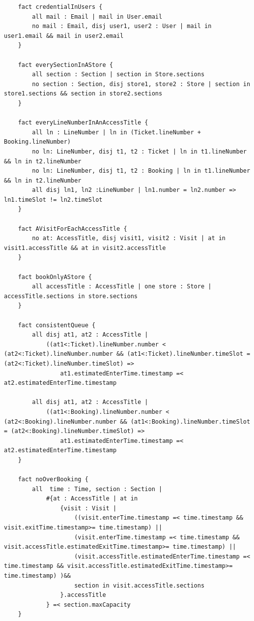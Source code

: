 \begin{lstlisting}
    fact credentialInUsers {
        all mail : Email | mail in User.email
        no mail : Email, disj user1, user2 : User | mail in user1.email && mail in user2.email
    }

    fact everySectionInAStore {
        all section : Section | section in Store.sections
        no section : Section, disj store1, store2 : Store | section in store1.sections && section in store2.sections
    }

    fact everyLineNumberInAnAccessTitle {
        all ln : LineNumber | ln in (Ticket.lineNumber + Booking.lineNumber)
        no ln: LineNumber, disj t1, t2 : Ticket | ln in t1.lineNumber && ln in t2.lineNumber
        no ln: LineNumber, disj t1, t2 : Booking | ln in t1.lineNumber && ln in t2.lineNumber
        all disj ln1, ln2 :LineNumber | ln1.number = ln2.number => ln1.timeSlot != ln2.timeSlot
    }

    fact AVisitForEachAccessTitle {
        no at: AccessTitle, disj visit1, visit2 : Visit | at in visit1.accessTitle && at in visit2.accessTitle
    }

    fact bookOnlyAStore {
        all accessTitle : AccessTitle | one store : Store | accessTitle.sections in store.sections
    }

    fact consistentQueue {
        all disj at1, at2 : AccessTitle |
            ((at1<:Ticket).lineNumber.number < (at2<:Ticket).lineNumber.number && (at1<:Ticket).lineNumber.timeSlot = (at2<:Ticket).lineNumber.timeSlot) =>
                at1.estimatedEnterTime.timestamp =< at2.estimatedEnterTime.timestamp

        all disj at1, at2 : AccessTitle |
            ((at1<:Booking).lineNumber.number < (at2<:Booking).lineNumber.number && (at1<:Booking).lineNumber.timeSlot = (at2<:Booking).lineNumber.timeSlot) =>
                at1.estimatedEnterTime.timestamp =< at2.estimatedEnterTime.timestamp
    }

    fact noOverBooking {
        all  time : Time, section : Section |
            #{at : AccessTitle | at in
                {visit : Visit |
                    ((visit.enterTime.timestamp =< time.timestamp && visit.exitTime.timestamp>= time.timestamp) ||
                    (visit.enterTime.timestamp =< time.timestamp && visit.accessTitle.estimatedExitTime.timestamp>= time.timestamp) ||
                    (visit.accessTitle.estimatedEnterTime.timestamp =< time.timestamp && visit.accessTitle.estimatedExitTime.timestamp>= time.timestamp) )&&
                    section in visit.accessTitle.sections
                }.accessTitle
            } =< section.maxCapacity
    }


\end{lstlisting}
